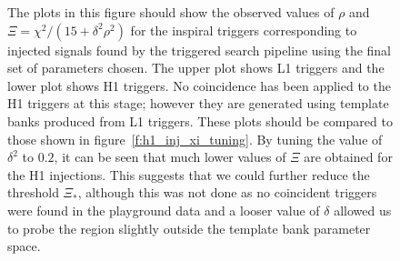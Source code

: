 \begin{figure}[p]
{\label{f:h1_inj_xi_final}%
The plots in this figure should show the observed values of $\rho$ and $\Xi
= \chi^2/(15 + \delta^2\rho^2)$ for the inspiral triggers corresponding to
injected signals found by the triggered search pipeline using the final set of
parameters chosen. The upper plot shows L1 triggers and the lower plot shows
H1 triggers. No coincidence has been applied to the H1 triggers at this stage;
however they are generated using template banks produced from L1 triggers.
These plots should be compared to those shown in
figure~\ref{f:h1_inj_xi_tuning}. By tuning the value of $\delta^2$ to $0.2$,
it can be seen that much lower values of $\Xi$ are obtained for the H1
injections. This suggests that we could further reduce the threshold
$\Xi_\ast$, although this was not done as no coincident triggers were found in
the playground data and a looser value of $\delta$ allowed us to probe the
region slightly outside the template bank parameter space.
}
\end{figure}

